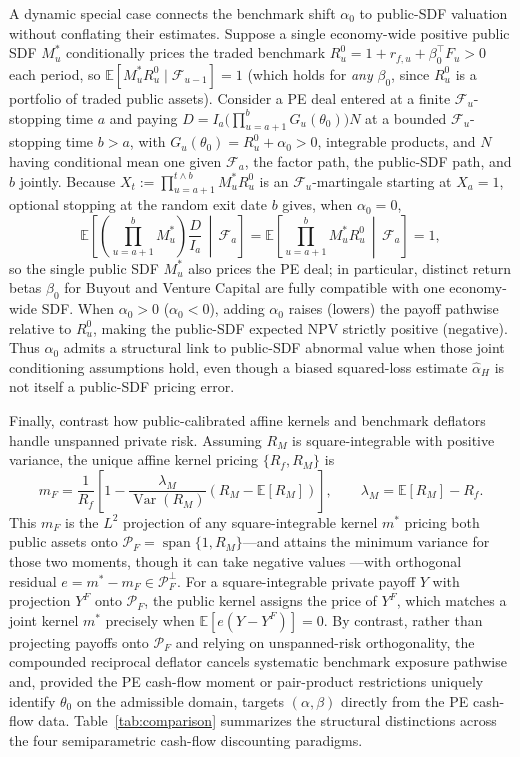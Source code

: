 A dynamic special case connects the benchmark shift $\alpha_0$ to public-SDF valuation without conflating their estimates. Suppose a single economy-wide positive public SDF $M_u^\ast$ conditionally prices the traded benchmark $R_u^0=1+r_{f,u}+\beta_0^\top F_u>0$ each period, so $\mathbb E[M_u^\ast R_u^0\mid\mathcal F_{u-1}]=1$ (which holds for \emph{any} $\beta_0$, since $R_u^0$ is a portfolio of traded public assets). Consider a PE deal entered at a finite $\mathcal F_u$-stopping time $a$ and paying $D=I_a\bigl(\prod_{u=a+1}^b G_u(\theta_0)\bigr)N$ at a bounded $\mathcal F_u$-stopping time $b>a$, with $G_u(\theta_0)=R_u^0+\alpha_0>0$, integrable products, and $N$ having conditional mean one given $\mathcal F_a$, the factor path, the public-SDF path, and $b$ jointly. Because $X_t := \prod_{u=a+1}^{t\wedge b} M_u^\ast R_u^0$ is an $\mathcal F_u$-martingale starting at $X_a=1$, optional stopping at the random exit date $b$ gives, when $\alpha_0=0$,
\[
 \mathbb E\!\left[\left(\prod_{u=a+1}^b M_u^\ast\right)\frac{D}{I_a}\,\middle|\,\mathcal F_a\right]
 = \mathbb E\!\left[\prod_{u=a+1}^b M_u^\ast R_u^0\,\middle|\,\mathcal F_a\right] = 1,
\]
so the single public SDF $M_u^\ast$ also prices the PE deal; in particular, distinct return betas $\beta_0$ for Buyout and Venture Capital are fully compatible with one economy-wide SDF. When $\alpha_0>0$ ($\alpha_0<0$), adding $\alpha_0$ raises (lowers) the payoff pathwise relative to $R_u^0$, making the public-SDF expected NPV strictly positive (negative). Thus $\alpha_0$ admits a structural link to public-SDF abnormal value when those joint conditioning assumptions hold, even though a biased squared-loss estimate $\hat\alpha_H$ is not itself a public-SDF pricing error.

Finally, contrast how public-calibrated affine kernels and benchmark deflators handle unspanned private risk. Assuming $R_M$ is square-integrable with positive variance, the unique affine kernel pricing $\{R_f,R_M\}$ is
\begin{equation}
\tag{\thesection.2}
\label{eq:appendix_sdf_public_projection}
 m_F=\frac{1}{R_f}\left[
  1-\frac{\lambda_M}{\operatorname{Var}(R_M)}
             (R_M-\mathbb E[R_M])
 \right],\qquad \lambda_M=\mathbb E[R_M]-R_f.
\end{equation}
This $m_F$ is the $L^2$ projection of any square-integrable kernel $m^\ast$ pricing both public assets onto $\mathcal P_F=\operatorname{span}\{1,R_M\}$---and attains the minimum variance for those two moments, though it can take negative values \citep{HJ91}---with orthogonal residual $e=m^\ast-m_F\in\mathcal P_F^\perp$. For a square-integrable private payoff $Y$ with projection $Y^F$ onto $\mathcal P_F$, the public kernel assigns the price of $Y^F$, which matches a joint kernel $m^\ast$ precisely when $\mathbb E[e(Y-Y^F)]=0$. By contrast, rather than projecting payoffs onto $\mathcal P_F$ and relying on unspanned-risk orthogonality, the compounded reciprocal deflator cancels systematic benchmark exposure pathwise and, provided the PE cash-flow moment or pair-product restrictions uniquely identify $\theta_0$ on the admissible domain, targets $(\alpha,\beta)$ directly from the PE cash-flow data. Table~\ref{tab:comparison} summarizes the structural distinctions across the four semiparametric cash-flow discounting paradigms.

